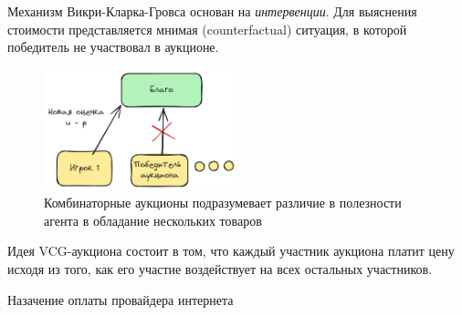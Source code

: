 Механизм Викри-Кларка-Гровса основан на \textit{интервенции}. Для выяснения стоимости представляется мнимая (counterfactual) ситуация, в которой победитель не участвовал в аукционе.

\begin{figure}[h]
    \centering
\includegraphics[width=0.5\textwidth]{assets/mechanism/vcg.excalidraw.png}
    \caption{Комбинаторные аукционы подразумевает различие в полезности агента в обладание нескольких товаров}
    \label{сombinatorial}
\end{figure}





 Идея VCG-аукциона состоит в том, что каждый участник аукциона платит цену исходя из того, как его участие воздействует на всех остальных участников. 


 Назачение оплаты провайдера интернета